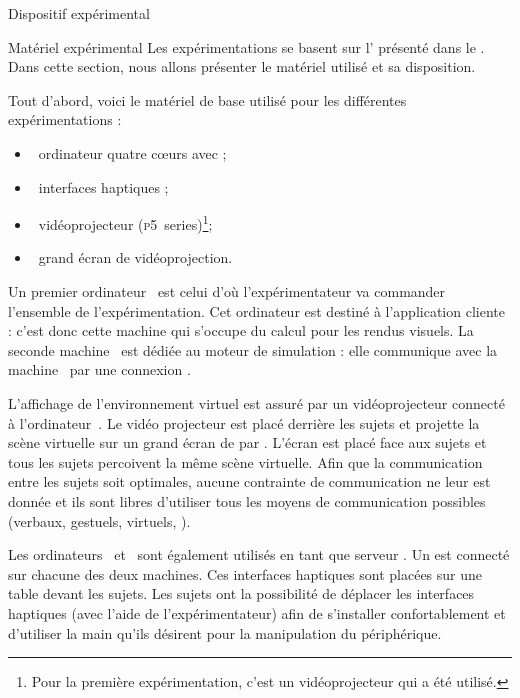 \documentclass[myfrancais,ngerman,english,frenchb]{mythesis}
\begin{document}
	\begin{mychapter}{Dispositif expérimental}
		\begin{mysection}{Matériel expérimental}
			Les expérimentations se basent sur l' présenté dans le .
			Dans cette section, nous allons présenter le matériel utilisé et sa disposition.

			Tout d'abord, voici le matériel de base utilisé pour les différentes expérimentations :
			\begin{itemize}
				\item {}~ordinateur quatre cœurs \myIntelCore avec ;
				\item {}~interfaces haptiques \myOmni;
				\item {}~vidéoprojecteur \myACER (\textsc{p5}~series)\footnote{Pour la première expérimentation, c'est un vidéoprojecteur \myCasioXJ qui a été utilisé.};
				\item {}~grand écran de vidéoprojection.
			\end{itemize}

			Un premier ordinateur~ est celui d'où l'expérimentateur va commander l'ensemble de l'expérimentation.
			Cet ordinateur est destiné à l'application cliente  : c'est donc cette machine qui s'occupe du calcul pour les rendus visuels.
			La seconde machine~ est dédiée au moteur de simulation  : elle communique avec la machine~ par une connexion \myTCPIP.

			L'affichage de l'environnement virtuel est assuré par un vidéoprojecteur connecté à l'ordinateur~.
			Le vidéo projecteur est placé derrière les sujets et projette la scène virtuelle sur un grand écran de  par .
			L'écran est placé face aux sujets et tous les sujets percoivent la même scène virtuelle.
			Afin que la communication entre les sujets soit optimales, aucune contrainte de communication ne leur est donnée et ils sont libres d'utiliser tous les moyens de communication possibles (verbaux, gestuels, virtuels, \myetc).

			Les ordinateurs~ et~ sont également utilisés en tant que serveur .
			Un \myOmni est connecté sur chacune des deux machines.
			Ces interfaces haptiques sont placées sur une table devant les sujets.
			Les sujets ont la possibilité de déplacer les interfaces haptiques (avec l'aide de l'expérimentateur) afin de s'installer confortablement et d'utiliser la main qu'ils désirent pour la manipulation du périphérique.


\end{mysection}
\end{mychapter}
\end{document}

